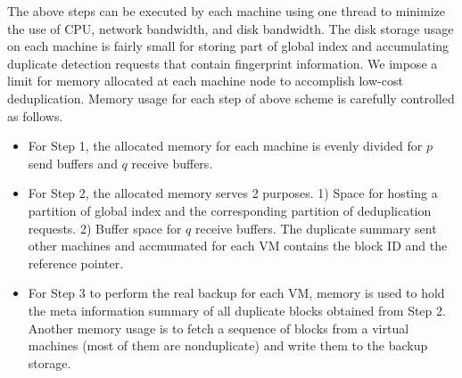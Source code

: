 The above steps can be executed by each machine
using one thread to minimize the use of CPU, network bandwidth, and disk bandwidth.
The  disk storage usage on each machine 
is fairly small for  storing part of global index and
accumulating  duplicate detection requests that contain fingerprint information.   
We impose a limit for memory allocated at each machine node to accomplish low-cost deduplication.  
Memory usage for each step of above scheme is carefully controlled as follows.
\begin{itemize}
\item For Step 1, the allocated memory for each machine is evenly divided for $p$ send buffers and $q$ receive buffers.

\item 
For Step 2,  the allocated memory serves 2 purposes. 1) Space for hosting a partition of global index and 
the corresponding partition of  deduplication requests. 2) Buffer space for $q$ receive buffers.
The duplicate summary sent other machines and accmumated for each VM contains
the block ID and  the reference pointer.   

\item For Step 3 to  perform the real backup for each VM, 
memory is used to hold the meta information summary of all duplicate blocks obtained  from Step 2. 
Another memory usage is to fetch a sequence of blocks from a virtual machines (most of them are nonduplicate) 
and write them to the  backup storage.

\end{itemize}

